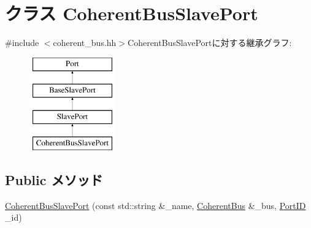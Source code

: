 \hypertarget{classCoherentBus_1_1CoherentBusSlavePort}{
\section{クラス CoherentBusSlavePort}
\label{classCoherentBus_1_1CoherentBusSlavePort}
}


{\ttfamily \#include $<$coherent\_\-bus.hh$>$}CoherentBusSlavePortに対する継承グラフ:\begin{figure}[H]
\begin{center}
\leavevmode
\includegraphics[height=4cm]{classCoherentBus_1_1CoherentBusSlavePort}
\end{center}
\end{figure}
\subsection*{Public メソッド}
\begin{DoxyCompactItemize}
\item 
\hyperlink{classCoherentBus_1_1CoherentBusSlavePort_ab33070885fab9d6b96607c346b03be7b}{CoherentBusSlavePort} (const std::string \&\_\-name, \hyperlink{classCoherentBus}{CoherentBus} \&\_\-bus, \hyperlink{base_2types_8hh_acef4d7d41cb21fdc252e20c04cd7bb8e}{PortID} \_\-id)
\end{DoxyCompactItemize}
